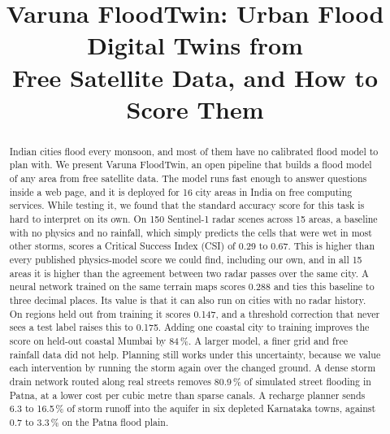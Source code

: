 \documentclass[conference]{IEEEtran}
\begin{document}
\title{Varuna FloodTwin: Urban Flood Digital Twins from\\
Free Satellite Data, and How to Score Them}

\author{
\and
{}
}

\maketitle

\begin{abstract}
Indian cities flood every monsoon, and most of them have no calibrated flood model to plan with. We
present Varuna FloodTwin, an open pipeline that builds a flood model of any area from free satellite
data. The model runs fast enough to answer questions inside a web page, and it is deployed for 16
city areas in India on free computing services. While testing it, we found that the standard
accuracy score for this task is hard to interpret on its own. On 150 Sentinel-1 radar scenes across
15 areas, a baseline with no physics and no rainfall, which simply predicts the cells that were wet
in most other storms, scores a Critical Success Index (CSI) of 0.29 to 0.67. This is higher than
every published physics-model score we could find, including our own, and in all 15 areas it is
higher than the agreement between two radar passes over the same city. A neural network trained on
the same terrain maps scores 0.288 and ties this baseline to three decimal places. Its value is that
it can also run on cities with no radar history. On regions held out from training it scores 0.147,
and a threshold correction that never sees a test label raises this to 0.175. Adding one coastal
city to training improves the score on held-out coastal Mumbai by 84\,\%. A larger model, a finer
grid and free rainfall data did not help. Planning still works under this uncertainty, because we
value each intervention by running the storm again over the changed ground. A dense storm drain
network routed along real streets removes 80.9\,\% of simulated street flooding in Patna, at a lower
cost per cubic metre than sparse canals. A recharge planner sends 6.3 to 16.5\,\% of storm runoff
into the aquifer in six depleted Karnataka towns, against 0.7 to 3.3\,\% on the Patna flood plain.
\end{abstract}
\end{document}
